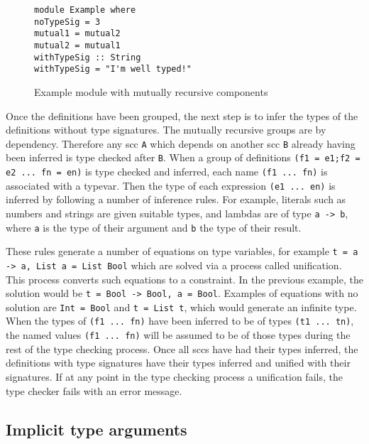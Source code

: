 \begin{figure}[!htb]
\centering
\begin{minipage}[b]{0.55\linewidth}
\centering
\begin{lstlisting}
module Example where
noTypeSig = 3
mutual1 = mutual2
mutual2 = mutual1
withTypeSig :: String
withTypeSig = "I'm well typed!"
\end{lstlisting}
\end{minipage}
\caption{Example module with mutually recursive components}
\label{lst:tc_impl}
\end{figure}

Once the definitions have been grouped, the next step is to infer the types of the definitions without type signatures. The mutually recursive groups are  by dependency. Therefore any \gls{scc} \texttt{A} which depends on another \gls{scc} \texttt{B} already having been inferred is type checked after \texttt{B}. When a group of definitions \texttt{(f1 = e1;f2 = e2 ... fn = en)} is type checked and inferred, each name \texttt{(f1 ... fn)} is associated with a \gls{typevar}. Then the type of each expression \texttt{(e1 ... en)} is inferred by following a number of inference rules. For example, literals such as numbers and strings are given suitable types, and lambdas are of type \texttt{a -> b},  where \texttt{a} is the type of their argument and \texttt{b} the type of their result.

These rules generate a number of equations on type variables, for example \texttt{t = a -> a, List a = List Bool} which are solved via a process called \gls{unification}. This process converts such equations to a \gls{constraint}. In the previous example, the solution would be \texttt{t = Bool -> Bool, a = Bool}. Examples of equations with no solution are \texttt{Int = Bool} and \texttt{t = List t}, which would generate an infinite type.
When the types of \texttt{(f1 ... fn)} have been inferred to be of types \texttt{(t1 ... tn)}, the named values \texttt{(f1 ... fn)} will be assumed to be of those types during the rest of the type checking process. Once all \glspl{scc} have had their types inferred, the definitions with type signatures have their types inferred and unified with their signatures. If at any point in the type checking process a \gls{unification} fails, the type checker fails with an error message.

\subsection{Implicit type arguments}

